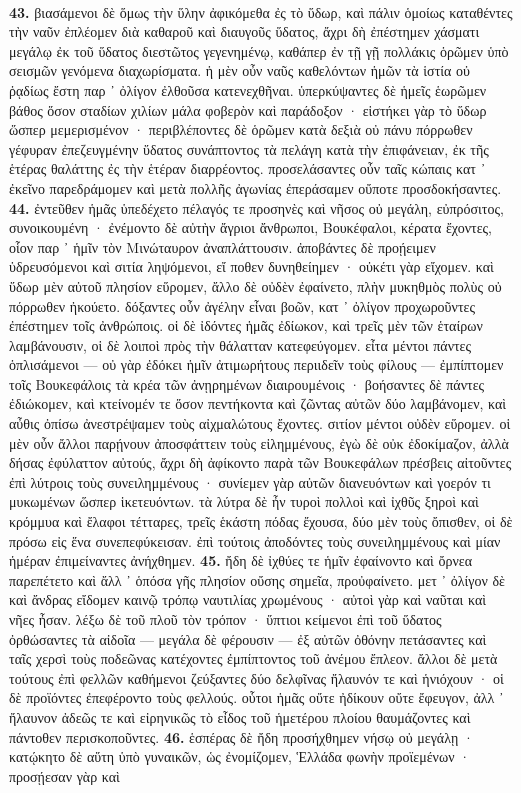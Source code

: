 \documentclass[a4paper, 11pt, oneside, polutonikogreek, german]{article}
\begin{document}
\paragraph{}
\textbf{43.} βιασάμενοι δὲ ὅμως τὴν ὕλην ἀφικόμεθα ἐς τὸ ὕδωρ, καὶ πάλιν ὁμοίως καταθέντες τὴν ναῦν ἐπλέομεν διὰ καθαροῦ καὶ διαυγοῦς ὕδατος, ἄχρι δὴ ἐπέστημεν χάσματι μεγάλῳ ἐκ τοῦ ὕδατος διεστῶτος γεγενημένῳ, καθάπερ ἐν τῇ γῇ πολλάκις ὁρῶμεν ὑπὸ σεισμῶν γενόμενα διαχωρίσματα. ἡ μὲν οὖν ναῦς καθελόντων ἡμῶν τὰ ἱστία οὐ ῥᾳδίως ἔστη παρ ᾽ ὀλίγον ἐλθοῦσα κατενεχθῆναι. ὑπερκύψαντες δὲ ἡμεῖς ἑωρῶμεν βάθος ὅσον σταδίων χιλίων μάλα φοβερὸν καὶ παράδοξον · εἱστήκει γὰρ τὸ ὕδωρ ὥσπερ μεμερισμένον · περιβλέποντες δὲ ὁρῶμεν κατὰ δεξιὰ οὐ πάνυ πόρρωθεν γέφυραν ἐπεζευγμένην ὕδατος συνάπτοντος τὰ πελάγη κατὰ τὴν ἐπιφάνειαν, ἐκ τῆς ἑτέρας θαλάττης ἐς τὴν ἑτέραν διαρρέοντος. προσελάσαντες οὖν ταῖς κώπαις κατ ᾽ ἐκεῖνο παρεδράμομεν καὶ μετὰ πολλῆς ἀγωνίας ἐπεράσαμεν οὔποτε προσδοκήσαντες. \textbf{44.} ἐντεῦθεν ἡμᾶς ὑπεδέχετο πέλαγός τε προσηνὲς καὶ νῆσος οὐ μεγάλη, εὐπρόσιτος, συνοικουμένη · ἐνέμοντο δὲ αὐτὴν ἄγριοι ἄνθρωποι, Βουκέφαλοι, κέρατα ἔχοντες, οἷον παρ ᾽ ἡμῖν τὸν Μινώταυρον ἀναπλάττουσιν. ἀποβάντες δὲ προῄειμεν ὑδρευσόμενοι καὶ σιτία ληψόμενοι, εἴ ποθεν δυνηθείημεν · οὐκέτι γὰρ εἴχομεν. καὶ ὕδωρ μὲν αὐτοῦ πλησίον εὕρομεν, ἄλλο δὲ οὐδὲν ἐφαίνετο, πλὴν μυκηθμὸς πολὺς οὐ πόρρωθεν ἠκούετο. δόξαντες οὖν ἀγέλην εἶναι βοῶν, κατ ᾽ ὀλίγον προχωροῦντες ἐπέστημεν τοῖς ἀνθρώποις. οἱ δὲ ἰδόντες ἡμᾶς ἐδίωκον, καὶ τρεῖς μὲν τῶν ἑταίρων λαμβάνουσιν, οἱ δὲ λοιποὶ πρὸς τὴν θάλατταν κατεφεύγομεν. εἶτα μέντοι πάντες ὁπλισάμενοι --- οὐ γὰρ ἐδόκει ἡμῖν ἀτιμωρήτους περιιδεῖν τοὺς φίλους --- ἐμπίπτομεν τοῖς Βουκεφάλοις τὰ κρέα τῶν ἀνῃρημένων διαιρουμένοις · βοήσαντες δὲ πάντες ἐδιώκομεν, καὶ κτείνομέν τε ὅσον πεντήκοντα καὶ ζῶντας αὐτῶν δύο λαμβάνομεν, καὶ αὖθις ὀπίσω ἀνεστρέψαμεν τοὺς αἰχμαλώτους ἔχοντες. σιτίον μέντοι οὐδὲν εὕρομεν. οἱ μὲν οὖν ἄλλοι παρῄνουν ἀποσφάττειν τοὺς εἰλημμένους, ἐγὼ δὲ οὐκ ἐδοκίμαζον, ἀλλὰ δήσας ἐφύλαττον αὐτούς, ἄχρι δὴ ἀφίκοντο παρὰ τῶν Βουκεφάλων πρέσβεις αἰτοῦντες ἐπὶ λύτροις τοὺς συνειλημμένους · συνίεμεν γὰρ αὐτῶν διανευόντων καὶ γοερόν τι μυκωμένων ὥσπερ ἱκετευόντων. τὰ λύτρα δὲ ἦν τυροὶ πολλοὶ καὶ ἰχθῦς ξηροὶ καὶ κρόμμυα καὶ ἔλαφοι τέτταρες, τρεῖς ἑκάστη πόδας ἔχουσα, δύο μὲν τοὺς ὄπισθεν, οἱ δὲ πρόσω εἰς ἕνα συνεπεφύκεισαν. ἐπὶ τούτοις ἀποδόντες τοὺς συνειλημμένους καὶ μίαν ἡμέραν ἐπιμείναντες ἀνήχθημεν. \textbf{45.} ἤδη δὲ ἰχθύες τε ἡμῖν ἐφαίνοντο καὶ ὄρνεα παρεπέτετο καὶ ἄλλ ᾽ ὁπόσα γῆς πλησίον οὔσης σημεῖα, προὐφαίνετο. μετ ᾽ ὀλίγον δὲ καὶ ἄνδρας εἴδομεν καινῷ τρόπῳ ναυτιλίας χρωμένους · αὐτοὶ γὰρ καὶ ναῦται καὶ νῆες ἦσαν. λέξω δὲ τοῦ πλοῦ τὸν τρόπον · ὕπτιοι κείμενοι ἐπὶ τοῦ ὕδατος ὀρθώσαντες τὰ αἰδοῖα --- μεγάλα δὲ φέρουσιν --- ἐξ αὐτῶν ὀθόνην πετάσαντες καὶ ταῖς χερσὶ τοὺς ποδεῶνας κατέχοντες ἐμπίπτοντος τοῦ ἀνέμου ἔπλεον. ἄλλοι δὲ μετὰ τούτους ἐπὶ φελλῶν καθήμενοι ζεύξαντες δύο δελφῖνας ἤλαυνόν τε καὶ ἡνιόχουν · οἱ δὲ προϊόντες ἐπεφέροντο τοὺς φελλούς. οὗτοι ἡμᾶς οὔτε ἠδίκουν οὔτε ἔφευγον, ἀλλ ᾽ ἤλαυνον ἀδεῶς τε καὶ εἰρηνικῶς τὸ εἶδος τοῦ ἡμετέρου πλοίου θαυμάζοντες καὶ πάντοθεν περισκοποῦντες. \textbf{46.} ἑσπέρας δὲ ἤδη προσήχθημεν νήσῳ οὐ μεγάλῃ · κατῴκητο δὲ αὕτη ὑπὸ γυναικῶν, ὡς ἐνομίζομεν, Ἑλλάδα φωνὴν προϊεμένων · προσῄεσαν γὰρ καὶ 
\end{document}

